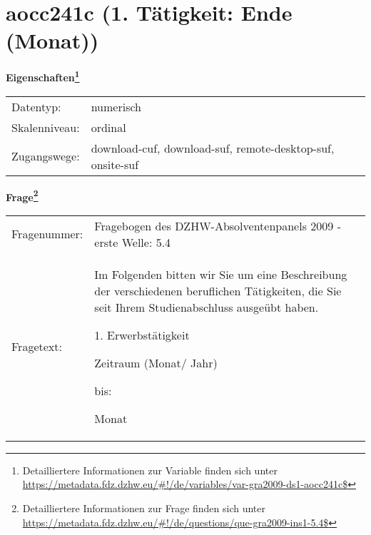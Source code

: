 
    \setcounter{footnote}{0}

    \vspace*{-1.8cm}
	\section{aocc241c (1. Tätigkeit: Ende (Monat))}
	\label{section:aocc241c}



    \vspace*{0.5cm}
    \noindent\textbf{Eigenschaften\footnote{Detailliertere Informationen zur Variable finden sich unter
		\url{https://metadata.fdz.dzhw.eu/\#!/de/variables/var-gra2009-ds1-aocc241c$}}}\\
	\begin{tabularx}{\hsize}{@{}lX}
	Datentyp: & numerisch \\
	Skalenniveau: & ordinal \\
	Zugangswege: &
	  download-cuf, 
	  download-suf, 
	  remote-desktop-suf, 
	  onsite-suf
 \\
    \end{tabularx}



				\vspace*{0.5cm}
                \noindent\textbf{Frage\footnote{Detailliertere Informationen zur Frage finden sich unter
		              \url{https://metadata.fdz.dzhw.eu/\#!/de/questions/que-gra2009-ins1-5.4$}}}\\
				\begin{tabularx}{\hsize}{@{}lX}
					Fragenummer: &
					  Fragebogen des DZHW-Absolventenpanels 2009 - erste Welle:
					  5.4
 \\
					Fragetext: & Im Folgenden bitten wir Sie um eine Beschreibung der verschiedenen beruflichen Tätigkeiten, die Sie seit Ihrem Studienabschluss ausgeübt haben.\par  1. Erwerbstätigkeit\par  Zeitraum (Monat/ Jahr)\par  bis:\par  Monat \\
				\end{tabularx}





